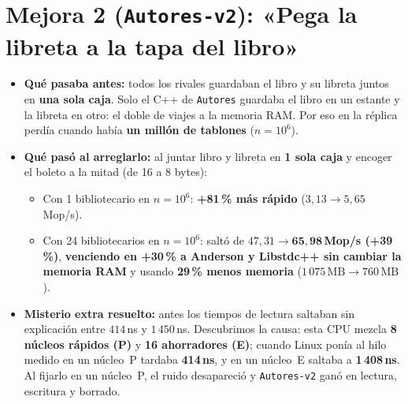 \documentclass[11pt,a4paper]{article}
\begin{document}
\section*{Mejora 2 (\texttt{Autores-v2}): «Pega la libreta a la tapa del libro»}
\begin{itemize}
  \item \textbf{Qué pasaba antes:} todos los rivales guardaban el libro y su libreta juntos en \textbf{una sola caja}. Solo el C++ de \texttt{Autores} guardaba el libro en un estante y la libreta en otro: el doble de viajes a la memoria RAM. Por eso en la réplica perdía cuando había \textbf{un millón de tablones} ($n = 10^6$).
  \item \textbf{Qué pasó al arreglarlo:} al juntar libro y libreta en \textbf{1 sola caja} y encoger el boleto a la mitad (de 16 a 8 bytes):
  \begin{itemize}
    \item Con 1 bibliotecario en $n = 10^6$: \textbf{+81\,\% más rápido} ($3{,}13 \to 5{,}65$\,Mop/s).
    \item Con 24 bibliotecarios en $n = 10^6$: saltó de $47{,}31 \to \mathbf{65{,}98}$\textbf{\,Mop/s (+39\,\%)}, \textbf{venciendo en +30\,\% a Anderson y Libstdc++ sin cambiar la memoria RAM} y usando \textbf{29\,\% menos memoria} ($1\,075\,\text{MB} \to 760\,\text{MB}$).
  \end{itemize}
  \item \textbf{Misterio extra resuelto:} antes los tiempos de lectura saltaban sin explicación entre $414$\,ns y $1\,450$\,ns. Descubrimos la causa: esta CPU mezcla \textbf{8 núcleos rápidos (P)} y \textbf{16 ahorradores (E)}; cuando Linux ponía al hilo medido en un núcleo~P tardaba \textbf{414\,ns}, y en un núcleo~E saltaba a \textbf{1\,408\,ns}. Al fijarlo en un núcleo~P, el ruido desapareció y \texttt{Autores-v2} ganó en lectura, escritura y borrado.
\end{itemize}
\end{document}

